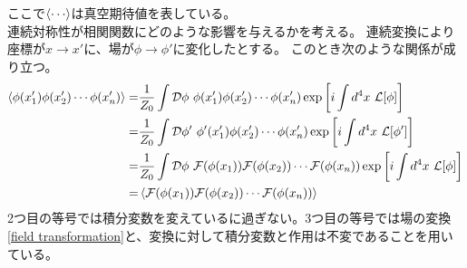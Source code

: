 \documentclass[11pt, dvipdfmx]{article}
\numberwithin{equation}{section}
\begin{document}
ここで$\ev{\cdots}$は真空期待値を表している。\\
連続対称性が相関関数にどのような影響を与えるかを考える。
連続変換により座標が$x\rightarrow x'$に、場が$\phi\rightarrow \phi'$に変化したとする。
このとき次のような関係が成り立つ。
\begin{align}
    \ev{\phi(x'_1)\phi(x'_2)\cdots \phi(x'_n)}=&\frac{1}{Z_0}\int \mathcal{D}\phi \ \phi(x'_1)\phi(x'_2)\cdots \phi(x'_n) \exp\qty[i\int d^4x \ \mathcal{L}[\phi]]\notag\\
    =&\frac{1}{Z_0}\int \mathcal{D}\phi' \ \phi'(x'_1)\phi(x'_2)\cdots \phi(x'_n) \exp\qty[i\int d^4x \ \mathcal{L}[\phi']]\notag\\
=&\frac{1}{Z_0}\int \mathcal{D}\phi \ \mathcal{F}(\phi(x_1))\mathcal{F}(\phi(x_2))\cdots \mathcal{F}(\phi(x_n)) \exp\qty[i\int d^4x \ \mathcal{L}[\phi]]\notag\\
=&\ev{\mathcal{F}(\phi(x_1))\mathcal{F}(\phi(x_2))\cdots \mathcal{F}(\phi(x_n))}
\end{align}  
2つ目の等号では積分変数を変えているに過ぎない。3つ目の等号では場の変換\eqref{field transformation}と、変換に対して積分変数と作用は不変であることを用いている。
\end{document}
